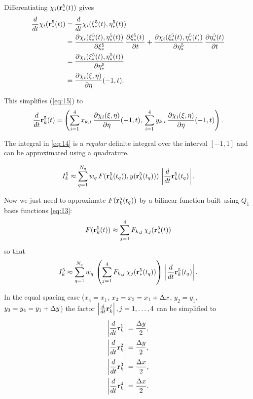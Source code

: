 \documentclass[11pt]{article}
\begin{document}
Differentiating $\chi_{i}(\mathbf{r}_{*}^{5}(t))$ gives
\begin{equation}
  \label{eq:37}
  \begin{aligned}
      \frac{d}{dt}\chi_{i}(\mathbf{r}_{*}^{5}(t)) &= \frac{d}{dt}\chi_{i}(\xi_{*}^{5}(t), \eta_{*}^{5}(t))\\
      &=\frac{\partial \chi_{i}(\xi_{*}^{5}(t), \eta_{*}^{5}(t))}{\partial \xi_{*}^{5}}\,\frac{\partial \xi_{*}^{5}(t)}{\partial t} +
      \frac{\partial \chi_{i}(\xi_{*}^{5}(t), \eta_{*}^{5}(t))}{\partial \eta_{*}^{5}}\,\frac{\partial \eta_{*}^{5}(t)}{\partial t}\\
      &= \frac{\partial \chi_{i}(\xi_{*}^{5}(t), \eta_{*}^{5}(t))}{\partial \eta_{*}^{5}}\\
      &=\frac{\partial \chi_{i}(\xi, \eta)}{\partial \eta}(-1, t).
  \end{aligned}
\end{equation}

This simplifies (\ref{eq:15}) to
\begin{equation}
  \label{eq:38}
\frac{d}{dt} \mathbf{r}_{k}^{5}(t) = \left( \sum_{i=1}^{4} x_{k,i}\,\frac{\partial \chi_{i}(\xi, \eta)}{\partial \eta}(-1, t),\,
                                 \sum_{i=1}^{4} y_{k,i}\,\frac{\partial \chi_{i}(\xi, \eta)}{\partial \eta}(-1, t) \right).
\end{equation}

The integral in \eqref{eq:14} is a \emph{regular} definite integral over
the interval $[-1, 1]$ and can be approximated using a quadrature.

\begin{equation}
\label{eq:16}
I_{k}^{5} \approx \sum_{q=1}^{N_{q}} w_{q}\, F(\mathbf{r}_{k}^{5}(t_{q})), y(\mathbf{r}_{k}^{5}(t_{q})))\, \left|\frac{d}{dt}\mathbf{r}_{k}^{5}(t_{q}) \right|.
\end{equation}

Now we just need to approximate $F(\mathbf{r}_{k}^{5}(t_{q}))$ by
a bilinear function built using $Q_{1}$ basis functions \eqref{eq:13}:
\begin{equation}
\label{eq:17}
F(\mathbf{r}_{k}^{5}(t)) \approx \sum_{j=1}^{4} F_{k,j}\, \chi_{j}(\mathbf{r}_{*}^{5}(t))
\end{equation}
so that
\begin{equation}
\label{eq:18}
I_{k}^{5} \approx \sum_{q=1}^{N_{q}} w_{q}\,
\left( \sum_{j=1}^{4} F_{k,j}\, \chi_{j}(\mathbf{r}_{*}^{5}(t_{q})) \right) \, \left| \frac{d}{dt}\mathbf{r}_{k}^{5}(t_{q}) \right|.
\end{equation}

In the equal spacing case ($x_{4} = x_{1}$, $x_{2} = x_{3} = x_{1} +
\Delta x$, $y_{2} = y_{1}$, $y_{3} = y_{4} = y_{1} + \Delta y$) the factor
$\left| \frac{d}{dt}\mathbf{r}_{k}^{j}\right|, j=1,\dots,4$ can be simplified to
\begin{align*}
\left| \frac{d}{dt}\mathbf{r}_{k}^{1}\right|  & = \frac{\Delta y}{2}, \\
\left| \frac{d}{dt}\mathbf{r}_{k}^{2}\right|  & = \frac{\Delta y}{2}, \\
\left| \frac{d}{dt}\mathbf{r}_{k}^{3}\right|  & = \frac{\Delta x}{2}, \\
\left| \frac{d}{dt}\mathbf{r}_{k}^{4}\right|  & = \frac{\Delta x}{2}. \\
\end{align*}
\end{document}
